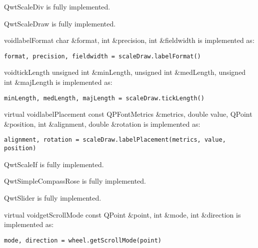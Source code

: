 \documentclass{manual}
\begin{document}
\begin{classdesc*}{QwtScaleDiv}
  is fully implemented.
\end{classdesc*}

\begin{classdesc*}{QwtScaleDraw}
  is fully implemented.

  \begin{cfuncdesc}{void}{labelFormat}{
      char \&format, int \&precision, int \&fieldwidth}
    is implemented as:
    \begin{verbatim}
format, precision, fieldwidth = scaleDraw.labelFormat()
    \end{verbatim}    
  \end{cfuncdesc}

  \begin{cfuncdesc}{void}{tickLength}{
      unsigned int \&minLength,
      unsigned int \&medLength,
      unsigned int \&majLength}
    is implemented as:
    \begin{verbatim}
minLength, medLength, majLength = scaleDraw.tickLength()
    \end{verbatim}    
  \end{cfuncdesc}

  \begin{cfuncdesc}{virtual void}{labelPlacement}{
      const QPFontMetrics \&metrics, double value, QPoint \&position,
      int \&alignment, double \&rotation}
    is implemented as:
    \begin{verbatim}
alignment, rotation = scaleDraw.labelPlacement(metrics, value, position)
    \end{verbatim}    
  \end{cfuncdesc}

\end{classdesc*}

\begin{classdesc*}{QwtScaleIf}
  is fully implemented.
\end{classdesc*}

\begin{classdesc*}{QwtSimpleCompassRose}
  is fully implemented.
\end{classdesc*}

\begin{classdesc*}{QwtSlider}
  is fully implemented.

  \begin{cfuncdesc}{virtual void}{getScrollMode}{
      const QPoint \&point, int \&mode, int \&direction}
    is implemented as:
    \begin{verbatim}
mode, direction = wheel.getScrollMode(point)
    \end{verbatim}    
  \end{cfuncdesc}

\end{classdesc*}
\end{document}
